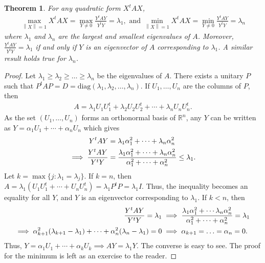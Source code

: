 \documentclass[15pt,a4paper]{book}
\newtheorem{theorem}{Theorem}[chapter]
\theoremstyle{definition}
\newcommand{\R}{\mathbb{R}}
\newcommand{\norm}[1]{\left\lVert#1\right\rVert}
\begin{document}
\begin{theorem}
    For any quadratic form $X^{t}AX$,
    \begin{align*}
        \max_{\norm{X} = 1} X^{t}AX = \max_{Y \neq 0} \frac{Y^{t}AY}{Y^{t}Y} = \lambda_{1}, \text{ and }
        \min_{\norm{X} = 1} X^{t}AX = \min_{Y \neq 0} \frac{Y^{t}AY}{Y^{t}Y} = \lambda_{n}
    \end{align*}
    where $\lambda_{1}$ and $\lambda_{n}$ are the largest and smallest eigenvalues of $A$. Moreover, $\frac{Y^{t}AY}{Y^{t}Y} = \lambda_{1}$ if and only if $Y$ is an eigenvector of $A$ corresponding to $\lambda_{1}$. A similar result holds true for $\lambda_{n}$.
\end{theorem}
\begin{proof}
    Let $\lambda_{1} \geq \lambda_{2} \geq \ldots \geq \lambda_{n}$ be the eigenvalues of $A$. There exists a unitary $P$ such that $P^{t}AP = D = \text{diag}(\lambda_{1},\lambda_{2},\ldots,\lambda_{n})$. If $U_{1},\ldots,U_{n}$ are the columns of $P$, then
    \begin{align}
        A = \lambda_{1}U_{1}U_{1}^{t} + \lambda_{2}U_{2}U_{2}^{t} + \cdots + \lambda_{n}U_{n}U_{n}^{t}.
    \end{align}
    As the set $(U_{1},\ldots,U_{n})$ forms an orthonormal basis of $\R^{n}$, any $Y$ can be written as $Y = \alpha_{1}U_{1} + \cdots + \alpha_{n}U_{n}$ which gives
    \begin{align}
        Y^{t}AY &= \lambda_{1}\alpha_{1}^{2} + \cdots + \lambda_{n}\alpha_{n}^{2} \notag \\
        \implies \frac{Y^{t}AY}{Y^{t}Y} &= \frac{\lambda_{1}\alpha_{1}^{2} + \cdots + \lambda_{n}\alpha_{n}^{2}}{\alpha_{1}^{2} + \cdots + \alpha_{n}^{2}} \leq \lambda_{1}.
    \end{align}
    Let $k = \max \{j : \lambda_{1} = \lambda_{j}\}$. If $k = n$, then $A = \lambda_{1}(U_{1}U_{1}^{t} + \cdots + U_{n}U_{n}^{t}) = \lambda_{1}P^{t}P = \lambda_{1}I$. Thus, the inequality becomes an equality for all $Y$, and $Y$ is an eigenvector corresponding to $\lambda_{1}$. If $k < n$, then
    \begin{align}
        \frac{Y^{t}AY}{Y^{t}Y} = \lambda_{1} &\implies \frac{\lambda_{1}\alpha_{1}^{2} + \cdots \lambda_{n}{\alpha_{n}^{2}}}{\alpha_{1}^{2}+ \cdots + \alpha_{n}^{2}} = \lambda_{1} \notag \\
        \implies \alpha_{k+1}^{2}(\lambda_{k+1}-\lambda_{1}) + \cdots + \alpha_{n}^{2}(\lambda_{n}-\lambda_{1}) = 0 &\implies \alpha_{k+1} = \ldots = \alpha_{n} = 0.
    \end{align}
    Thus, $Y = \alpha_{1}U_{1} + \cdots + \alpha_{k}U_{k} \implies AY = \lambda_{1}Y$. The converse is easy to see. The proof for the minimum is left as an exercise to the reader.
\end{proof}
\end{document}
